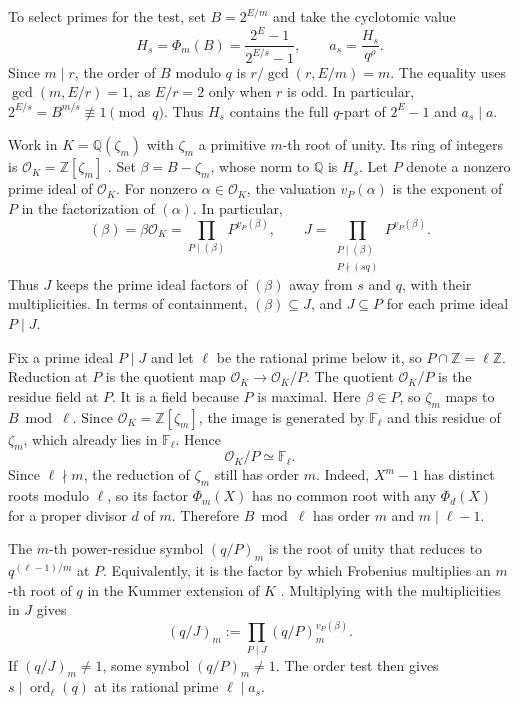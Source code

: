 \documentclass[11pt]{article}
\begin{document}
To select primes for the test, set $B=2^{E/m}$ and take the
cyclotomic value
\[
H_s=\Phi_m(B)
  =\frac{2^E-1}{2^{E/s}-1},
\qquad a_s=\frac{H_s}{q^\rho}.
\]
Since $m\mid r$, the order of $B$ modulo $q$ is
$r/\gcd(r,E/m)=m$. The equality uses $\gcd(m,E/r)=1$,
as $E/r=2$ only when $r$ is odd.
In particular, $2^{E/s}=B^{m/s}\not\equiv1\pmod q$. Thus $H_s$
contains the full $q$-part of $2^E-1$ and $a_s\mid a$.

Work in $K=\mathbb Q(\zeta_m)$ with $\zeta_m$ a primitive $m$-th
root of unity. Its ring of integers is $\mathcal O_K=\mathbb Z[\zeta_m]$
\cite[Chapter 2]{Washington}. Set $\beta=B-\zeta_m$, whose norm to
$\mathbb Q$ is $H_s$. Let $P$ denote a nonzero prime ideal of
$\mathcal O_K$. For nonzero $\alpha\in\mathcal O_K$, the valuation
$v_P(\alpha)$ is the exponent of $P$ in the factorization of
$(\alpha)$. In particular,
\[
(\beta)=\beta\mathcal O_K=\prod_{P\mid(\beta)}P^{v_P(\beta)},
\qquad
J=\prod_{\substack{P\mid(\beta)\\ P\nmid(sq)}}P^{v_P(\beta)}.
\]
Thus $J$ keeps the prime ideal factors of $(\beta)$ away from $s$
and $q$, with their multiplicities. In terms of containment,
$(\beta)\subseteq J$, and $J\subseteq P$ for each prime ideal $P\mid J$.

Fix a prime ideal $P\mid J$ and let $\ell$ be the rational prime
below it, so $P\cap\mathbb Z=\ell\mathbb Z$. Reduction at $P$
is the quotient map $\mathcal O_K\to\mathcal O_K/P$.
The quotient $\mathcal O_K/P$ is the residue field at $P$.
It is a field because $P$ is maximal.
Here $\beta\in P$, so $\zeta_m$ maps to $B\bmod\ell$. Since
$\mathcal O_K=\mathbb Z[\zeta_m]$, the image is generated by
$\mathbb F_\ell$ and this residue of $\zeta_m$, which already lies
in $\mathbb F_\ell$. Hence
\[
\mathcal O_K/P\simeq\mathbb F_\ell.
\]
Since $\ell\nmid m$, the reduction of $\zeta_m$ still has order $m$.
Indeed, $X^m-1$ has distinct roots modulo $\ell$, so its factor
$\Phi_m(X)$ has no common root with any $\Phi_d(X)$ for a proper
divisor $d$ of $m$. Therefore $B\bmod\ell$ has order $m$ and
$m\mid\ell-1$.

The $m$-th power-residue symbol $(q/P)_m$ is the root of unity
that reduces to $q^{(\ell-1)/m}$ at $P$. Equivalently, it is the
factor by which Frobenius multiplies an $m$-th root of $q$ in the
Kummer extension of $K$ \cite[\S\S2,4]{StevenhagenKummer}.
Multiplying with the multiplicities in $J$ gives
\[
(q/J)_m:=\prod_{P\mid J}(q/P)_m^{v_P(\beta)}.
\]
If $(q/J)_m\ne1$, some symbol $(q/P)_m\ne1$. The order test
then gives $s\mid\operatorname{ord}_\ell(q)$ at its rational prime
$\ell\mid a_s$.
\end{document}
